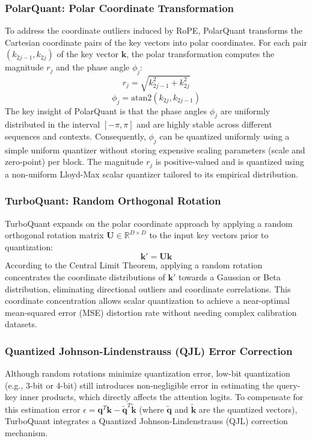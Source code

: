 \subsubsection{PolarQuant: Polar Coordinate Transformation}
To address the coordinate outliers induced by RoPE, PolarQuant \cite{han2025polarquant} transforms the Cartesian coordinate pairs of the key vectors into polar coordinates. For each pair $(k_{2j-1}, k_{2j})$ of the key vector $\mathbf{k}$, the polar transformation computes the magnitude $r_j$ and the phase angle $\phi_j$:
\begin{equation}
r_j = \sqrt{k_{2j-1}^2 + k_{2j}^2}
\end{equation}
\begin{equation}
\phi_j = \text{atan2}(k_{2j}, k_{2j-1})
\end{equation}
The key insight of PolarQuant is that the phase angles $\phi_j$ are uniformly distributed in the interval $[-\pi, \pi]$ and are highly stable across different sequences and contexts. Consequently, $\phi_j$ can be quantized uniformly using a simple uniform quantizer without storing expensive scaling parameters (scale and zero-point) per block. The magnitude $r_j$ is positive-valued and is quantized using a non-uniform Lloyd-Max scalar quantizer tailored to its empirical distribution.

\subsubsection{TurboQuant: Random Orthogonal Rotation}
TurboQuant \cite{zandieh2025turboquant} expands on the polar coordinate approach by applying a random orthogonal rotation matrix $\mathbf{U} \in \mathbb{R}^{D \times D}$ to the input key vectors prior to quantization:
\begin{equation}
\mathbf{k}' = \mathbf{U} \mathbf{k}
\end{equation}
According to the Central Limit Theorem, applying a random rotation concentrates the coordinate distributions of $\mathbf{k}'$ towards a Gaussian or Beta distribution, eliminating directional outliers and coordinate correlations. This coordinate concentration allows scalar quantization to achieve a near-optimal mean-squared error (MSE) distortion rate without needing complex calibration datasets.

\subsubsection{Quantized Johnson-Lindenstrauss (QJL) Error Correction}
Although random rotations minimize quantization error, low-bit quantization (e.g., 3-bit or 4-bit) still introduces non-negligible error in estimating the query-key inner products, which directly affects the attention logits. To compensate for this estimation error $\epsilon = \mathbf{q}^T \mathbf{k} - \tilde{\mathbf{q}}^T \tilde{\mathbf{k}}$ (where $\tilde{\mathbf{q}}$ and $\tilde{\mathbf{k}}$ are the quantized vectors), TurboQuant integrates a Quantized Johnson-Lindenstrauss (QJL) correction mechanism. 

